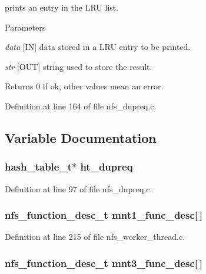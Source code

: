 prints an entry in the LRU list.


\begin{DoxyParams}{Parameters}
\item[{\em data}][IN] data stored in a LRU entry to be printed. \item[{\em str}][OUT] string used to store the result.\end{DoxyParams}
\begin{DoxyReturn}{Returns}
0 if ok, other values mean an error. 
\end{DoxyReturn}


Definition at line 164 of file nfs\_\-dupreq.c.

\subsection{Variable Documentation}
\subsubsection[{ht\_\-dupreq}]{\setlength{\rightskip}{0pt plus 5cm}hash\_\-table\_\-t$\ast$ {\bf ht\_\-dupreq}}\label{nfs__dupreq_8c_a3ada0731d68a5b4aab865acfd3d73290}


Definition at line 97 of file nfs\_\-dupreq.c.
\subsubsection[{mnt1\_\-func\_\-desc}]{\setlength{\rightskip}{0pt plus 5cm}nfs\_\-function\_\-desc\_\-t {\bf mnt1\_\-func\_\-desc}[$\,$]}\label{nfs__dupreq_8c_a331b43564c209696c670c70673d544e1}


Definition at line 215 of file nfs\_\-worker\_\-thread.c.
\subsubsection[{mnt3\_\-func\_\-desc}]{\setlength{\rightskip}{0pt plus 5cm}nfs\_\-function\_\-desc\_\-t {\bf mnt3\_\-func\_\-desc}[$\,$]}\label{nfs__dupreq_8c_a7bcfef9b974d9b55a0f057d959a13bb8}


